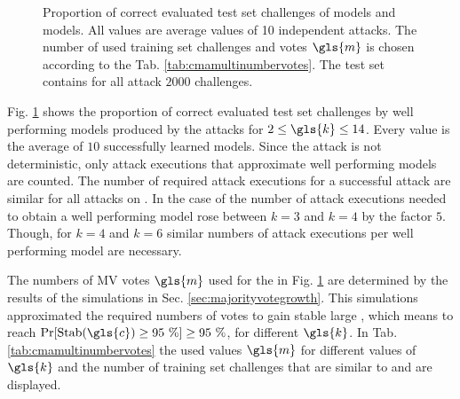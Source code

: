 \begin{figure}[ht]
	\fi
\fi
\caption[Proportion of correct evaluated test set challenges for \acs{XOR} Arbiter \puf models and Majority \acs{XOR} Arbiter \puf models]{Proportion of correct evaluated test set challenges of \xpuf models and \mxpuf models. All values are average values of 10 independent attacks. The number of used training set challenges and votes $\gls{m}$ is chosen according to the Tab. \ref{tab:cmamultinumbervotes}. The test set contains for all attack $2000$ challenges.}
\label{fig:cmamultiattackmodelperformance}
\end{figure}

Fig. \ref{fig:cmamultiattackmodelperformance} shows the proportion of correct evaluated test set challenges by well performing models produced by the attacks for $2 \le \gls{k} \le 14$.
Every value is the average of $10$ successfully learned models.
Since the attack is not deterministic, only attack executions that approximate well performing models are counted.
The number of required attack executions for a successful attack are similar for all attacks on \xpufs.
In the case of \mxpufs the number of attack executions needed to obtain a well performing model rose between $k = 3$ and $k = 4$ by the factor $5$.
Though, for $k = 4$ and $k = 6$ similar numbers of attack executions per well performing model are necessary.

The numbers of \ac{MV} votes $\gls{m}$ used for the \mxpufs in Fig. \ref{fig:cmamultiattackmodelperformance} are determined by the results of the simulations in Sec. \ref{sec:majorityvotegrowth}.
This simulations approximated the required numbers of votes to gain stable large \mxpufs, which means to reach $\Pr[\protect\Stab(\gls{c}) \ge 95\ \%] \ge 95\ \%$, for different $\gls{k}$.
In Tab. \ref{tab:cmamultinumbervotes} the used values $\gls{m}$ for different values of $\gls{k}$ and the number of training set challenges that are similar to \xpufs and \mxpufs are displayed.

